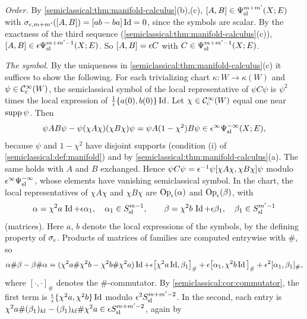 \subsection*{}
\emph{Order.} By \cref{semiclassical:thm:manifold-calculus}(b),(c),
$[A,B]\in\Psi^{m+m'}_{\mathrm{sl}}(X;E)$ with $\sigma_{\epsilon,m+m'}([A,B])=[ab-ba]\operatorname{Id}=0$, since the symbols are scalar.
By the exactness of the third sequence (\cref{semiclassical:thm:manifold-calculus}(c)),
$[A,B]\in\epsilon\Psi^{m+m'-1}_{\mathrm{sl}}(X;E)$. So $[A,B]=\epsilon C$ with $C\in\Psi^{m+m'-1}_{\mathrm{sl}}(X;E)$.

\emph{The symbol.} By the uniqueness in \cref{semiclassical:thm:manifold-calculus}(c) it
suffices to show the following. For each trivializing chart $\kappa:W\to\kappa(W)$ and
$\psi\in\mathcal{C}^\infty_{\mathrm{c}}(W)$, the semiclassical symbol of the local representative of $\psi C\psi$ is $\psi^2$ times
the local expression of $\frac1i\{a(0),b(0)\}\operatorname{Id}$. Let $\chi\in\mathcal{C}^\infty_{\mathrm{c}}(W)$ equal one near $\operatorname{supp}\psi$. Then
\begin{equation*}
\psi AB\psi-\psi(\chi A\chi)(\chi B\chi)\psi=\psi A(1-\chi^2)B\psi\in\epsilon^\infty\Psi^{-\infty}_{\mathrm{sl}}(X;E),
\end{equation*}
because $\psi$ and $1-\chi^2$ have disjoint supports (condition (i) of
\cref{semiclassical:def:manifold}) and by \cref{semiclassical:thm:manifold-calculus}(a). The
same holds with $A$ and $B$ exchanged. Hence
$\psi C\psi=\epsilon^{-1}\psi[\chi A\chi,\chi B\chi]\psi$ modulo $\epsilon^\infty\Psi^{-\infty}_{\mathrm{sl}}$, whose elements have
vanishing semiclassical symbol. In the chart, the local representatives of $\chi A\chi$ and
$\chi B\chi$ are $\operatorname{Op}_\epsilon(\alpha)$ and $\operatorname{Op}_\epsilon(\beta)$, with
\begin{equation*}
\alpha=\chi^2a\,\operatorname{Id}+\epsilon\alpha_1,\quad\alpha_1\in S^{m-1}_{\mathrm{sl}},\qquad\beta=\chi^2b\,\operatorname{Id}+\epsilon\beta_1,\quad\beta_1\in S^{m'-1}_{\mathrm{sl}}
\end{equation*}
(matrices). Here $a$, $b$ denote the local expressions of the symbols, by the defining
property of $\sigma_{\epsilon}$. Products of matrices of families are computed entrywise with $\#$, so
\begin{equation*}
\alpha\#\beta-\beta\#\alpha=(\chi^2a\#\chi^2b-\chi^2b\#\chi^2a)\operatorname{Id}+\epsilon\big[\chi^2a\operatorname{Id},\beta_1\big]_\#
+\epsilon\big[\alpha_1,\chi^2b\operatorname{Id}\big]_\#+\epsilon^2[\alpha_1,\beta_1]_\#,
\end{equation*}
where $[\cdot,\cdot]_\#$ denotes the $\#$-commutator. By \cref{semiclassical:cor:commutator}, the first
term is $\frac{\epsilon} i\{\chi^2a,\chi^2b\}\operatorname{Id}$ modulo $\epsilon^2S^{m+m'-2}_{\mathrm{sl}}$. In the second, each entry is
$\chi^2a\#(\beta_1)_{kl}-(\beta_1)_{kl}\#\chi^2a\in\epsilon S^{m+m'-2}_{\mathrm{sl}}$, again by
